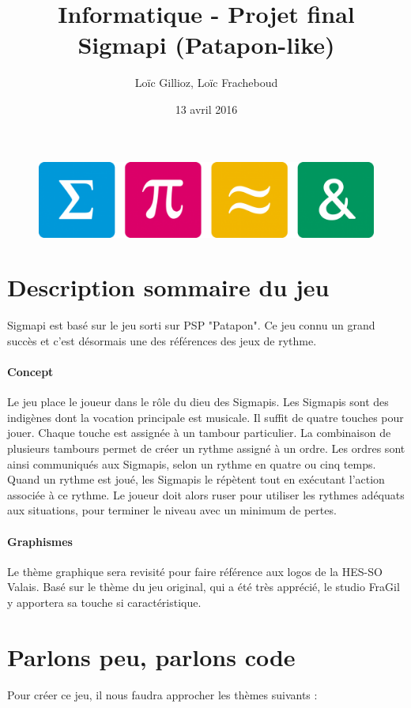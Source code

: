 \documentclass[a4paper,10pt]{article}
\author{Loïc Gillioz, Loïc Fracheboud}
\title{Informatique - Projet final \\ \Huge Sigmapi (Patapon-like)}
\date{13 avril 2016}
\begin{document}
 \maketitle
 \begin{figure}[!h]
 \centering
 \includegraphics[scale=0.15]{images/icones}
 \end{figure}
 \pagebreak
 
 \section{Description sommaire du jeu}
  Sigmapi est basé sur le jeu sorti sur PSP "Patapon". Ce jeu connu un grand succès et c'est désormais une des références des jeux de rythme.
  \paragraph*{Concept}
  Le jeu place le joueur dans le rôle du dieu des Sigmapis. Les Sigmapis sont des indigènes dont la vocation principale est musicale.
Il suffit de quatre touches pour jouer. Chaque touche est assignée à un tambour particulier. La combinaison de plusieurs tambours permet de créer un rythme assigné à un ordre. Les ordres sont ainsi communiqués aux Sigmapis, selon un rythme en quatre ou cinq temps. Quand un rythme est joué, les Sigmapis le répètent tout en exécutant l'action associée à ce rythme. Le joueur doit alors ruser pour utiliser les rythmes adéquats aux situations, pour terminer le niveau avec un minimum de pertes.
  \paragraph*{Graphismes}
Le thème graphique sera revisité pour faire référence aux logos de la \mbox{HES-SO} Valais. Basé sur le thème du jeu original, qui a été très apprécié, le studio FraGil y apportera sa touche si caractéristique.
  \section{Parlons peu, parlons code}
  Pour créer ce jeu, il nous faudra approcher les thèmes suivants :
\end{document}
